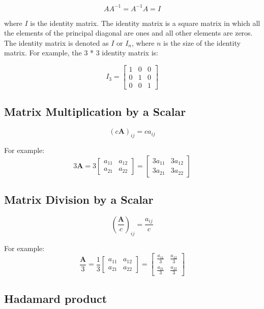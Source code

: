 \documentclass[11pt]{article}
\begin{document}
    \[
    A A^{-1} = A^{-1} A = I
    \]

    where \( I \) is the identity matrix. The identity matrix is a square matrix in which all the elements of the principal diagonal are ones and all other elements are zeros.
    The identity matrix is denoted as \( I \) or \( I_n \), where \( n \) is the size of the identity matrix. For example, the 3 * 3 identity matrix is:


    \[
    I_3 =
    \begin{bmatrix}
    1 & 0 & 0 \\
    0 & 1 & 0 \\
    0 & 0 & 1
    \end{bmatrix}
    \]

    \subsection{Matrix Multiplication by a Scalar}

    \[
(c \mathbf{A})_{ij} = c a_{ij}
\]

For example:
    \[
3 \mathbf{A} =
3 \begin{bmatrix}
a_{11} & a_{12} \\
a_{21} & a_{22}
\end{bmatrix}
=
\begin{bmatrix}
3 a_{11} & 3 a_{12} \\
3 a_{21} & 3 a_{22}
\end{bmatrix}
\]

    \subsection{Matrix Division by a Scalar}

    \[
\left( \frac{\mathbf{A}}{c} \right)_{ij} = \frac{a_{ij}}{c}
\]

For example:
    \[
\frac{\mathbf{A}}{3} =
\frac{1}{3} \begin{bmatrix}
a_{11} & a_{12} \\
a_{21} & a_{22}
\end{bmatrix}
=
\begin{bmatrix}
\frac{a_{11}}{3} & \frac{a_{12}}{3} \\
\frac{a_{21}}{3} & \frac{a_{22}}{3}
\end{bmatrix}
\]


    \subsection{Hadamard product}
\end{document}

